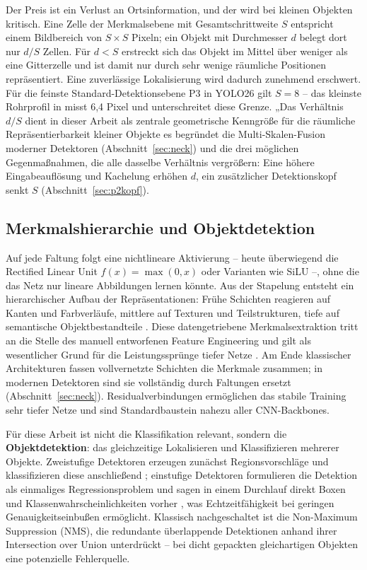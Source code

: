 Der Preis ist ein Verlust an Ortsinformation, und der wird bei kleinen Objekten
kritisch. Eine Zelle der Merkmalsebene mit Gesamtschrittweite $S$ entspricht
einem Bildbereich von $S \times S$ Pixeln; ein Objekt mit Durchmesser $d$ belegt
dort nur $d/S$ Zellen. Für \(d<S\) erstreckt sich das Objekt im Mittel über weniger
 als eine Gitterzelle und ist damit nur durch sehr wenige räumliche Positionen repräsentiert.
  Eine zuverlässige Lokalisierung wird dadurch zunehmend erschwert. Für die feinste
Standard-Detektionsebene P3 in YOLO26 gilt $S = 8$ -- das kleinste Rohrprofil in
 misst 6,4 Pixel und unterschreitet diese Grenze. „Das Verhältnis \(d/S\) 
dient in dieser Arbeit als zentrale geometrische Kenngröße für die räumliche Repräsentierbarkeit
 kleiner Objekte es begründet
die Multi-Skalen-Fusion moderner Detektoren (Abschnitt~\ref{sec:neck}) und die
drei möglichen Gegenmaßnahmen, die alle dasselbe Verhältnis vergrößern: Eine
höhere Eingabeauflösung und Kachelung erhöhen $d$, ein zusätzlicher
Detektionskopf senkt $S$ (Abschnitt~\ref{sec:p2kopf}).

\subsection{Merkmalshierarchie und Objektdetektion}
\label{sec:hierarchie}

Auf jede Faltung folgt eine nichtlineare Aktivierung -- heute überwiegend die
Rectified Linear Unit $f(x) = \max(0,x)$ oder Varianten wie SiLU
\parencite{krizhevsky2012} --, ohne die das Netz nur lineare Abbildungen lernen
könnte. Aus der Stapelung entsteht ein hierarchischer Aufbau der
Repräsentationen: Frühe Schichten reagieren auf Kanten und Farbverläufe, mittlere
auf Texturen und Teilstrukturen, tiefe auf semantische Objektbestandteile
\parencite{zeiler2014}. Diese datengetriebene Merkmalsextraktion tritt an die
Stelle des manuell entworfenen Feature Engineering und gilt als wesentlicher
Grund für die Leistungssprünge tiefer Netze \parencite{lecun2015}. Am Ende
klassischer Architekturen fassen vollvernetzte Schichten die Merkmale zusammen;
in modernen Detektoren sind sie vollständig durch Faltungen ersetzt
(Abschnitt~\ref{sec:neck}). Residualverbindungen \parencite{he2016} ermöglichen
das stabile Training sehr tiefer Netze und sind Standardbaustein nahezu aller
CNN-Backbones.

Für diese Arbeit ist nicht die Klassifikation relevant, sondern die
\textbf{Objektdetektion}: das gleichzeitige Lokalisieren und Klassifizieren
mehrerer Objekte. Zweistufige Detektoren erzeugen zunächst Regionsvorschläge und
klassifizieren diese anschließend \parencite{ren2015}; einstufige Detektoren
formulieren die Detektion als einmaliges Regressionsproblem und sagen in einem
Durchlauf direkt Boxen und Klassenwahrscheinlichkeiten vorher
\parencite{redmon2016,liu2016ssd}, was Echtzeitfähigkeit bei geringen
Genauigkeitseinbußen ermöglicht. Klassisch nachgeschaltet ist die
Non-Maximum Suppression (NMS), die redundante überlappende Detektionen anhand
ihrer Intersection over Union unterdrückt -- bei dicht gepackten gleichartigen
Objekten eine potenzielle Fehlerquelle.

